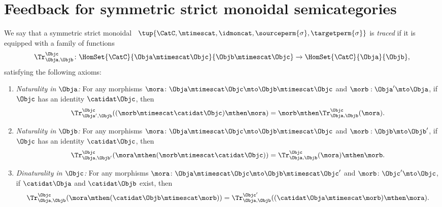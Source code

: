 
\section{Feedback for symmetric strict monoidal semicategories}
\begin{widepar}
    \begin{ctdefinition}
        \label{def:traced-fun-stack-scat}
        We say that a symmetric strict monoidal ~$\tup{\CatC,\mtimescat, \idmoncat, \sourceperm{\sigma}, \targetperm{\sigma} }$ is \emph{traced} if it is equipped with a family of functions
        \begin{equation}
            \Tr_{\Obja,\Objb}^\Objc\colon \HomSet{\CatC}{\Obja \mtimescat \Objc}{\Objb\mtimescat \Objc}\to \HomSet{\CatC}{\Obja}{\Objb},
        \end{equation}
        satisfying the following axioms:
        \begin{enumerate}

            \item \emph{Naturality in $\Obja$:} For any morphisms $\mora\colon \Obja\mtimescat \Objc \mto \Objb\mtimescat \Objc$ and $\morb : \Obja' \mto \Obja$, if $\Objc$ has an identity $\catidat\Objc$, then
                  \begin{equation}
                      \Tr_{\Obja', \Objb}^\Objc ( (\morb \mtimescat \catidat\Objc) \mthen \mora) = \morb \mthen \Tr_{\Obja, \Objb}^\Objc (\mora).
                  \end{equation}

            \item \emph{Naturality in $\Objb$:}
                  For any morphisms $\mora\colon \Obja\mtimescat \Objc \mto \Objb\mtimescat \Objc$ and $\morb : \Objb \mto \Objb'$, if $\Objc$ has an identity $\catidat\Objc$, then
                  \begin{equation}
                      \Tr_{\Obja, \Objb'}^\Objc ( \mora \mthen (\morb \mtimescat \catidat\Objc) ) =  \Tr_{\Obja, \Objb}^\Objc (\mora) \mthen \morb.
                  \end{equation}

            \item \emph{Dinaturality in $\Objc$:}
                  For any morphisms $\mora \colon \Obja \mtimescat \Objc \mto \Objb \mtimescat \Objc'$ and $\morb \colon \Objc' \mto \Objc$, if $\catidat\Obja$ and $\catidat\Objb$ exist, then
                  \begin{equation}
                      \Tr_{\Obja, \Objb}^{\Objc} (\mora \mthen (\catidat\Objb \mtimescat \morb)) = \Tr_{\Obja, \Objb}^{\Objc'}((\catidat\Obja \mtimescat \morb) \mthen \mora).
                  \end{equation}


\end{enumerate}
\end{ctdefinition}
\end{widepar}
